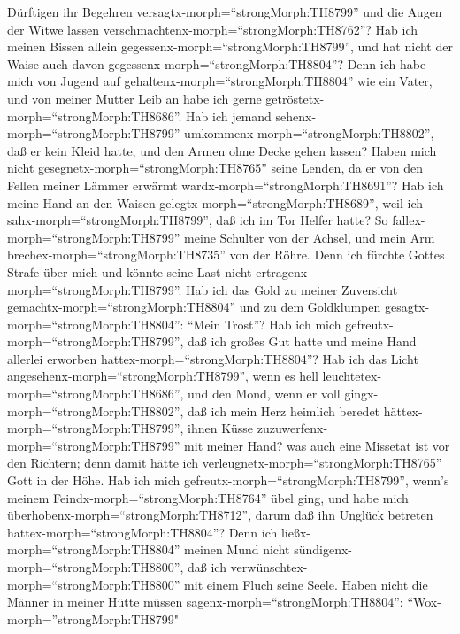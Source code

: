 Dürftigen ihr Begehren versagtx-morph=``strongMorph:TH8799'' und die
Augen der Witwe lassen verschmachtenx-morph=``strongMorph:TH8762''?
 Hab ich meinen Bissen allein
gegessenx-morph=``strongMorph:TH8799'', und hat nicht der Waise auch
davon gegessenx-morph=``strongMorph:TH8804''?  Denn ich
habe mich von Jugend auf gehaltenx-morph=``strongMorph:TH8804'' wie ein
Vater, und von meiner Mutter Leib an habe ich gerne
getröstetx-morph=``strongMorph:TH8686''.  Hab ich jemand
sehenx-morph=``strongMorph:TH8799''
umkommenx-morph=``strongMorph:TH8802'', daß er kein Kleid hatte, und den
Armen ohne Decke gehen lassen?  Haben mich nicht
gesegnetx-morph=``strongMorph:TH8765'' seine Lenden, da er von den
Fellen meiner Lämmer erwärmt wardx-morph=``strongMorph:TH8691''?
 Hab ich meine Hand an den Waisen
gelegtx-morph=``strongMorph:TH8689'', weil ich
sahx-morph=``strongMorph:TH8799'', daß ich im Tor Helfer hatte?
 So fallex-morph=``strongMorph:TH8799'' meine Schulter von
der Achsel, und mein Arm brechex-morph=``strongMorph:TH8735'' von der
Röhre.  Denn ich fürchte Gottes Strafe über mich und könnte
seine Last nicht ertragenx-morph=``strongMorph:TH8799''. 
Hab ich das Gold zu meiner Zuversicht
gemachtx-morph=``strongMorph:TH8804'' und zu dem Goldklumpen
gesagtx-morph=``strongMorph:TH8804'': ``Mein Trost''?  Hab
ich mich gefreutx-morph=``strongMorph:TH8799'', daß ich großes Gut hatte
und meine Hand allerlei erworben hattex-morph=``strongMorph:TH8804''?
 Hab ich das Licht angesehenx-morph=``strongMorph:TH8799'',
wenn es hell leuchtetex-morph=``strongMorph:TH8686'', und den Mond, wenn
er voll gingx-morph=``strongMorph:TH8802'',  daß ich mein
Herz heimlich beredet hättex-morph=``strongMorph:TH8799'', ihnen Küsse
zuzuwerfenx-morph=``strongMorph:TH8799'' mit meiner Hand? 
was auch eine Missetat ist vor den Richtern; denn damit hätte ich
verleugnetx-morph=``strongMorph:TH8765'' Gott in der Höhe. 
Hab ich mich gefreutx-morph=``strongMorph:TH8799'', wenn's meinem
Feindx-morph=``strongMorph:TH8764'' übel ging, und habe mich
überhobenx-morph=``strongMorph:TH8712'', darum daß ihn Unglück betreten
hattex-morph=``strongMorph:TH8804''?  Denn ich
ließx-morph=``strongMorph:TH8804'' meinen Mund nicht
sündigenx-morph=``strongMorph:TH8800'', daß ich
verwünschtex-morph=``strongMorph:TH8800'' mit einem Fluch seine Seele.
 Haben nicht die Männer in meiner Hütte müssen
sagenx-morph=``strongMorph:TH8804'': ``Wox-morph=''strongMorph:TH8799"
